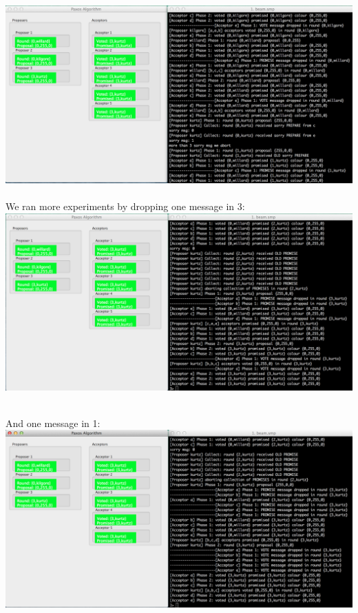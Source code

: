 \documentclass[a4paper, 11pt]{article}
\begin{document}
\includegraphics[scale=0.35]{images/exp7-drop5.png} \\\\

We ran more experiments by dropping one message in 3:\\

\includegraphics[scale=0.35]{images/exp7-drop3.png} \\\\
\newpage

And one message in 1:\\

\includegraphics[scale=0.35]{images/exp7-drop1.png} \\\\
\end{document}
